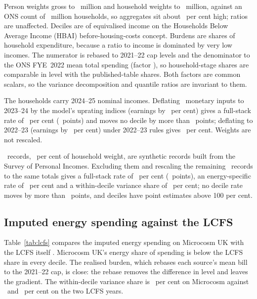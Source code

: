  Person weights gross to \SsPersonsM\
million and household weights to \SsWeightedHouseholdsM\ million,
against an ONS count of \SsOnsHouseholdsM\ million households, so
aggregates sit about \SsWeightExcessPct\ per cent high; ratios are
unaffected. Deciles are of equivalised income on the Households Below
Average Income (HBAI) before-housing-costs concept. Burdens are shares
of household expenditure, because a ratio to income is dominated by
very low incomes. The numerator is rebased to 2021--22 cap levels and
the denominator to the ONS FYE~2022 mean total spending (factor
\SsSpendRebase), so household-stage shares are comparable in level
with the published-table shares. Both factors are common scalars, so
the variance decomposition and quantile ratios are invariant to them.

 The households carry 2024--25 nominal
incomes. Deflating \SsDeflInputsScaled\ monetary inputs to 2023--24 by
the model's uprating indices (earnings by
\SsDeflEarningsFactorTwentyThreePct\ per cent) gives a full-stack rate
of \SsDeflFullRatePct\ per cent (\SsDeflFullRateDiffPp\ points) and
moves no decile by more than \SsDeflMaxDecileDiffPp\ points; deflating
to 2022--23 (earnings by \SsDeflEarningsFactorTwentyTwoPct\ per cent)
under 2022--23 rules gives \SsDeflRulesTwentyTwoFullRatePct\ per cent.
Weights are not rescaled.

 \SsNoSynRecordsExcluded\ records,
\SsNoSynWeightSharePct\ per cent of household weight, are synthetic
records built from the Survey of Personal Incomes. Excluding them and
rescaling the remaining \SsNoSynRecordsKept\ records to the same
totals gives a full-stack rate of \SsNoSynDiscretionaryRatePct\ per
cent (\SsNoSynFullRateDiffPp\ points), an energy-specific rate of
\SsNoSynEnergySpecificRatePct\ per cent and a within-decile variance
share of \SsNoSynWithinPct\ per cent; no decile rate moves by more
than \SsNoSynMaxDecileDiffPp\ points, and
\numword{\SsNoSynDecilesAboveHundred} deciles have point estimates above 100
per cent.

\subsection{Imputed energy spending against the LCFS}

Table~\ref{tab:lcfs} compares the imputed energy spending on Microcosm
UK with the LCFS itself \citep{lcfs}. Microcosm UK's energy share of
spending is below the LCFS share in every decile. The realised burden,
which rebases each source's mean bill to the 2021--22 cap, is close:
the rebase removes the difference in level and leaves the gradient.
The within-decile variance share is \SsWithinPct\ per cent on
Microcosm against \SsLcfsWithinPct\ and \SsLcfsTwentyTwoWithinPct\ per
cent on the two LCFS years.

